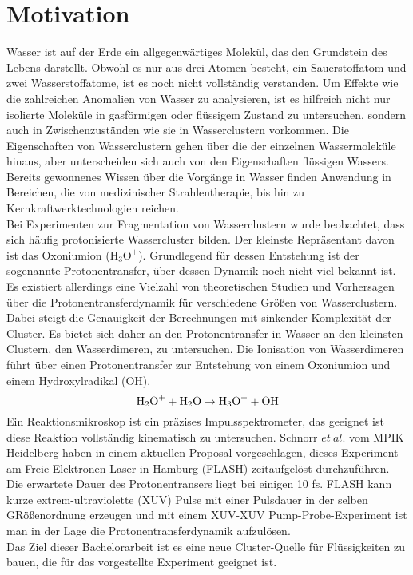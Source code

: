 
  \chapter{Motivation} \label{sec:Motivation}
  
Wasser ist auf der Erde ein allgegenwärtiges Molekül, das den Grundstein des Lebens darstellt.
Obwohl es nur aus drei Atomen besteht, ein Sauerstoffatom und zwei Wasserstoffatome, ist es noch nicht vollständig verstanden. Um Effekte wie die zahlreichen Anomalien von Wasser \cite{WAS} zu analysieren, ist es hilfreich nicht nur isolierte Moleküle in gasförmigen oder flüssigem Zustand zu untersuchen, sondern auch in Zwischenzuständen wie sie in Wasserclustern vorkommen. Die Eigenschaften von Wasserclustern gehen über die der einzelnen Wassermoleküle hinaus, aber unterscheiden sich auch von den Eigenschaften flüssigen Wassers. Bereits gewonnenes Wissen über die Vorgänge in Wasser finden Anwendung in Bereichen, die von medizinischer Strahlentherapie, bis hin zu Kernkraftwerktechnologien reichen.\\
Bei Experimenten zur Fragmentation von Wasserclustern wurde beobachtet, dass sich häufig protonisierte Wassercluster bilden. Der kleinste Repräsentant davon ist das Oxoniumion ($\mathrm{H_3O^+}$). Grundlegend für dessen Entstehung ist der sogenannte Protonentransfer, über dessen Dynamik noch nicht viel bekannt ist. Es existiert allerdings eine Vielzahl von theoretischen Studien und Vorhersagen über die Protonentransferdynamik für verschiedene Größen von Wasserclustern. Dabei steigt die Genauigkeit der Berechnungen mit sinkender Komplexität der Cluster. Es bietet sich daher an den Protonentransfer in Wasser an den kleinsten Clustern, den Wasserdimeren, zu untersuchen. Die Ionisation von Wasserdimeren führt über einen Protonentransfer zur Entstehung von einem Oxoniumion und einem Hydroxylradikal (OH).
  \begin{equation}
  \textmd{H}_2\textmd{O}^+ + \textmd{H}_2\textmd{O} \rightarrow \textmd{H}_3\textmd{O}^+ + \textmd{O}\textmd{H} 
  \end{equation} 
Ein Reaktionsmikroskop ist ein präzises Impulsspektrometer, das geeignet ist diese Reaktion vollständig kinematisch zu untersuchen. Schnorr $et \ al.$ vom MPIK Heidelberg haben in einem aktuellen Proposal vorgeschlagen, dieses Experiment am Freie-Elektronen-Laser in Hamburg (FLASH) zeitaufgelöst durchzuführen. Die erwartete Dauer des Protonentransers liegt bei einigen 10 fs. FLASH kann kurze extrem-ultraviolette (XUV) Pulse mit einer Pulsdauer in der selben GRößenordnung erzeugen und mit einem XUV-XUV Pump-Probe-Experiment ist man in der Lage die Protonentransferdynamik aufzulösen. \\
\clearpage
Das Ziel dieser Bachelorarbeit ist es eine neue Cluster-Quelle für Flüssigkeiten zu bauen, die für das vorgestellte Experiment geeignet ist.\\

